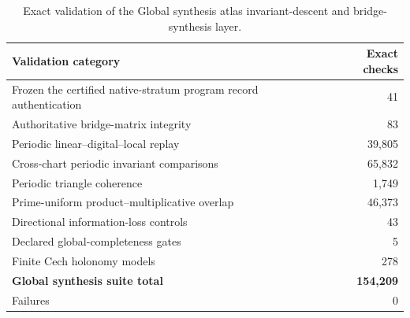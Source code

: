 \begin{table}[htbp]
\centering
\caption{Exact validation of the Global synthesis atlas invariant-descent and bridge-synthesis layer.}
\label{tab:block13-bridge-synthesis-validation}
\small
\begin{tabularx}{\textwidth}{@{}L{0.42\textwidth}r@{}}
\toprule
Validation category & Exact checks\\
\midrule
Frozen the certified native-stratum program record authentication & 41\\
Authoritative bridge-matrix integrity & 83\\
Periodic linear--digital--local replay & 39,805\\
Cross-chart periodic invariant comparisons & 65,832\\
Periodic triangle coherence & 1,749\\
Prime-uniform product--multiplicative overlap & 46,373\\
Directional information-loss controls & 43\\
Declared global-completeness gates & 5\\
Finite Cech holonomy models & 278\\
\midrule
\textbf{Global synthesis suite total} & \textbf{154,209}\\
Failures & 0\\
\bottomrule
\end{tabularx}
\end{table}
